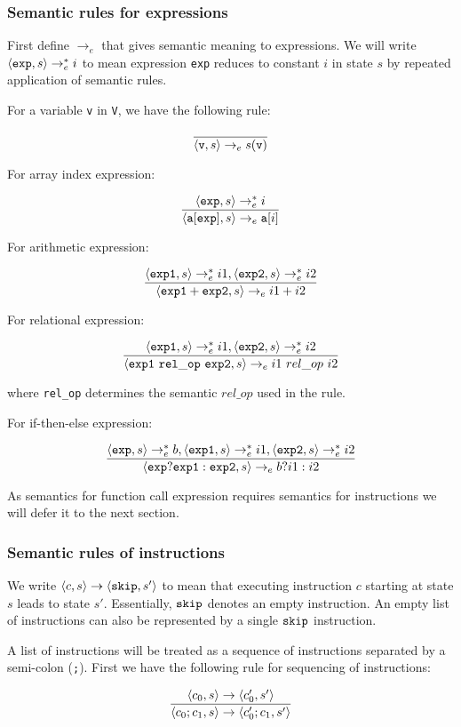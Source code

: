\subsubsection{Semantic rules for expressions}
First define
\(\rightarrow_e\) that gives semantic meaning to expressions. We will
write \(\langle {\tt exp}, s \rangle \rightarrow_{e}^{*} i\) to mean expression {\tt exp} reduces
to constant \(i\) in state \(s\) by repeated application of semantic
rules. 

For a variable {\tt v} in {\tt V}, we have the following rule:

\[\frac{}{\langle {\tt v}, s \rangle \rightarrow_{e} s({\tt v})}\]

For array index expression:


\[\frac{\langle {\tt exp}, s \rangle \rightarrow_{e}^{*} i}{\langle {\tt a[exp]}, s \rangle \rightarrow_{e} {\tt a[}i{\tt ]}}\]


For arithmetic expression:

\[\frac{{\langle {\tt exp1}, s \rangle \rightarrow_{e}^{*} i1}, {\langle {\tt exp2}, s \rangle \rightarrow_{e}^{*} i2}}{\langle {\tt exp1 + exp2}, s \rangle \rightarrow_{e} {i1 + i2}}\]

For relational expression:

\[\frac{{\langle {\tt exp1}, s \rangle \rightarrow_{e}^{*} i1}, {\langle {\tt exp2}, s \rangle \rightarrow_{e}^{*} i2}}{\langle {\tt exp1 ~rel\_op ~exp2}, s \rangle \rightarrow_{e} {i1 ~rel\_op ~i2}}\]

where {\tt rel\_op} determines the semantic \(rel\_op\) used in the rule.

For if-then-else expression:

\[\frac{{\langle {\tt exp}, s \rangle \rightarrow_{e}^{*} b}, {\langle {\tt exp1}, s \rangle \rightarrow_{e}^{*} i1}, {\langle {\tt exp2}, s \rangle \rightarrow_{e}^{*} i2} }{\langle {\tt exp ? exp1 : exp2 }, s \rangle \rightarrow_{e} b?i1:i2}\]

As semantics for function call expression requires semantics for
instructions we will defer it to the next section.

\subsubsection{Semantic rules of instructions}

We write \(\langle c, s \rangle \rightarrow \langle {\bf \tt skip}, s'\rangle\) to mean that executing instruction
\(c\) starting at state \(s\) leads to state \(s'\). Essentially,
\({\bf \tt skip}\) denotes an empty instruction. An empty list of instructions
can also be represented by a single \({\bf \tt skip}\) instruction.

A list of instructions will be treated as a sequence of instructions
separated by a semi-colon ({\tt ;}). First we have the following rule
for sequencing of instructions:

\[\frac{\langle c_0, s \rangle \rightarrow \langle c'_0, s'\rangle}{\langle c_0;c_1, s \rangle \rightarrow \langle c'_0;c_1, s'\rangle}\]

